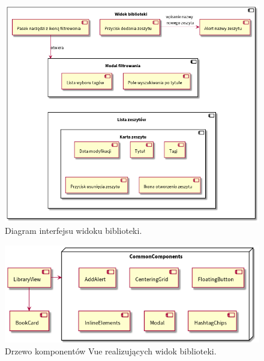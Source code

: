 \begin{figure}[H]
	\begin{center}
		\includegraphics[scale=0.55]{media/LibraryInterface.png}
	\end{center}
	\caption{Diagram interfejsu widoku biblioteki.}
	\label{rys:library-interface}
\end{figure}

\begin{figure}[H]
	\begin{center}
		\includegraphics[scale=0.55]{media/LibraryComponents.png}
	\end{center}
	\caption{Drzewo komponentów Vue realizujących widok biblioteki.}
	\label{rys:library-components}
\end{figure}

